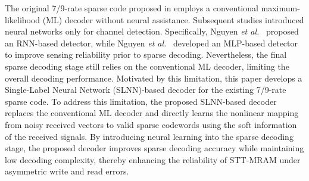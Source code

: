 \documentclass[conference]{IEEEtran}
\begin{document}
The original 7/9-rate sparse code proposed in \cite{nguyen2021design} employs a conventional maximum-likelihood (ML) decoder without neural assistance. Subsequent studies introduced neural networks only for channel detection. Specifically, Nguyen \textit{et al.}~\cite{nguyen2021performance} proposed an RNN-based detector, while Nguyen \textit{et al.}~\cite{nguyen2023neural} developed an MLP-based detector to improve sensing reliability prior to sparse decoding. Nevertheless, the final sparse decoding stage still relies on the conventional ML decoder, limiting the overall decoding performance. Motivated by this limitation, this paper develops a Single-Label Neural Network (SLNN)-based decoder for the existing 7/9-rate sparse code. 
To address this limitation, the proposed SLNN-based decoder replaces the conventional ML decoder and directly learns the nonlinear mapping from noisy received vectors to valid sparse codewords using the soft information of the received signals. By introducing neural learning into the sparse decoding stage, the proposed decoder improves sparse decoding accuracy while maintaining low decoding complexity, thereby enhancing the reliability of STT-MRAM under asymmetric write and read errors.








\end{document}

